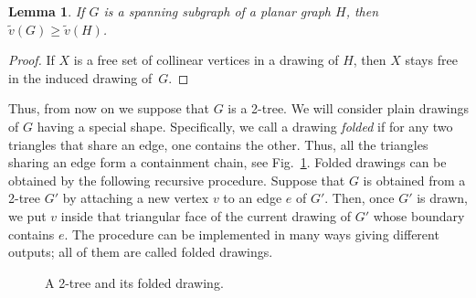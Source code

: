 \documentclass[reqno,12pt]{amsart}
\newcommand{\free}[1]{\tilde v(#1)}
\newtheorem{lemma}[theorem]{Lemma}
\begin{document}
\begin{lemma}
If $G$ is a spanning subgraph of a planar graph $H$, then
$\free G\ge\free H$.
\end{lemma}

\begin{proof}
If $X$ is a free set of collinear vertices in a drawing of $H$,
then $X$ stays free in the induced drawing of~$G$.
\end{proof}

Thus, from now on we suppose that $G$ is a 2-tree. We will consider plain drawings of $G$
having a special shape. Specifically, we call a drawing \emph{folded}
if for any two triangles that share an edge, one contains the other.
Thus, all the triangles sharing an edge form a containment chain,
see Fig.~\ref{fig:folded}.
Folded drawings can be obtained by the following recursive procedure.
Suppose that $G$ is obtained from a 2-tree $G'$ by attaching a new vertex $v$
to an edge $e$ of $G'$. Then, once $G'$ is drawn, we put $v$
inside that triangular face of the current drawing of $G'$ whose boundary contains $e$.
The procedure can be implemented
in many ways giving different outputs; all of them are called folded drawings.


\begin{figure}
\centering
\qquad\qquad\qquad
\caption{A 2-tree and its folded drawing.}
\label{fig:folded}
\end{figure}
\end{document}
